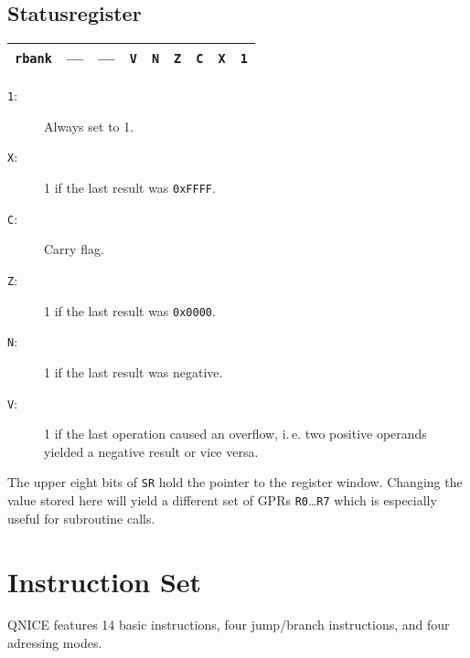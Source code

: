 \documentclass{leaflet}
\begin{document}
  \subsection{Statusregister}
   \begin{center}
    \begin{longtable}{|c||c|c|c|c|c|c|c|c|}
     \hline
     {\tt rbank}&
     ---&---&{\tt V}&{\tt N}&{\tt Z}&{\tt C}&{\tt X}&{\tt 1}\\
     \hline
    \end{longtable}
    \vspace*{-9mm}
   \end{center}
   \begin{description}
    \item [{\tt 1}:] Always set to 1.
    \item [{\tt X}:] 1 if the last result was {\tt 0xFFFF}.
    \item [{\tt C}:] Carry flag.
    \item [{\tt Z}:] 1 if the last result was {\tt 0x0000}.
    \item [{\tt N}:] 1 if the last result was negative.
    \item [{\tt V}:] 1 if the last operation caused an overflow, i.\,e. two
     positive operands yielded a negative result or vice versa.
   \end{description}
   The upper eight bits of \texttt{SR} hold the pointer to the register
   window. Changing the value stored here will yield a different set of 
   GPRs \texttt{R0}\dots\texttt{R7} which is especially useful for subroutine
   calls.
   \vspace*{-5mm}
%
 \section{Instruction Set}
  QNICE features 14 basic instructions, four jump/branch instructions, and 
  four adressing modes.
  \vspace*{-3mm}
%
\end{document}
